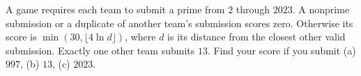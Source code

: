 A game requires each team to submit a prime from $2$ through $2023$. A nonprime submission or a duplicate of another team's submission scores zero. Otherwise its score is $\min(30,\lfloor4\ln d\rfloor)$, where $d$ is its distance from the closest other valid submission. Exactly one other team submits $13$. Find your score if you submit (a) $997$, (b) $13$, (c) $2023$.
